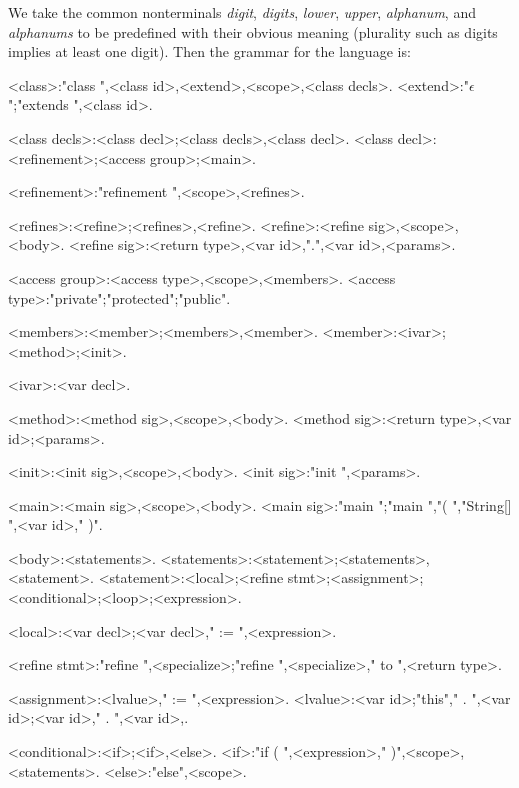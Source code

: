 We take the common nonterminals \emph{digit}, \emph{digits}, \emph{lower}, \emph{upper}, \emph{alphanum}, and \emph{alphanums} to be predefined with their obvious meaning (plurality such as digits implies at least one digit). Then the grammar for the language is:

\begin{grammar}
<class>:"class ",<class id>,<extend>,<scope>,<class decls>.
<extend>:"$\epsilon$";"extends ",<class id>.

<class decls>:<class decl>;<class decls>,<class decl>.
<class decl>:<refinement>;<access group>;<main>.

<refinement>:"refinement ",<scope>,<refines>.

<refines>:<refine>;<refines>,<refine>.
<refine>:<refine sig>,<scope>,<body>.
<refine sig>:<return type>,<var id>,".",<var id>,<params>.

<access group>:<access type>,<scope>,<members>.
<access type>:"private";"protected";"public".

<members>:<member>;<members>,<member>.
<member>:<ivar>;<method>;<init>.

<ivar>:<var decl>.

<method>:<method sig>,<scope>,<body>.
<method sig>:<return type>,<var id>;<params>.

<init>:<init sig>,<scope>,<body>.
<init sig>:"init ",<params>.

<main>:<main sig>,<scope>,<body>.
<main sig>:"main ";"main ","( ","String[] ",<var id>," )".

<body>:<statements>.
<statements>:<statement>;<statements>,<statement>.
<statement>:<local>;<refine stmt>;<assignment>;<conditional>;<loop>;<expression>.

<local>:<var decl>;<var decl>," := ",<expression>.

<refine stmt>:"refine ",<specialize>;"refine ",<specialize>," to ",<return type>.

<assignment>:<lvalue>," := ",<expression>.
<lvalue>:<var id>;"this"," . ",<var id>;<var id>," . ",<var id>,.

<conditional>:<if>;<if>,<else>.
<if>:"if ( ",<expression>," )",<scope>,<statements>.
<else>:"else",<scope>.


\end{grammar}

